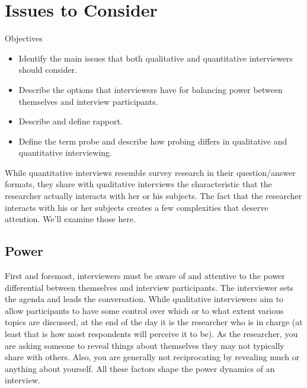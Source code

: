 \section{Issues to Consider}

\begin{center}
	\begin{objbox}{Objectives}
		\begin{itemize}
			\setlength{\itemsep}{0pt}
			\setlength{\parskip}{0pt}
			\setlength{\parsep}{0pt}
			
			\item Identify the main issues that both qualitative and quantitative interviewers should consider.
			\item Describe the options that interviewers have for balancing power between themselves and interview participants.
			\item Describe and define rapport.
			\item Define the term probe and describe how probing differs in qualitative and quantitative interviewing.
			
		\end{itemize}
	\end{objbox}
\end{center}

While quantitative interviews resemble survey research in their question/answer formats, they share with qualitative interviews the characteristic that the researcher actually interacts with her or his subjects. The fact that the researcher interacts with his or her subjects creates a few complexities that deserve attention. We’ll examine those here.

\subsection{Power}

First and foremost, interviewers must be aware of and attentive to the power differential between themselves and interview participants. The interviewer sets the agenda and leads the conversation. While qualitative interviewers aim to allow participants to have some control over which or to what extent various topics are discussed, at the end of the day it is the researcher who is in charge (at least that is how most respondents will perceive it to be). As the researcher, you are asking someone to reveal things about themselves they may not typically share with others. Also, you are generally not reciprocating by revealing much or anything about yourself. All these factors shape the power dynamics of an interview.

